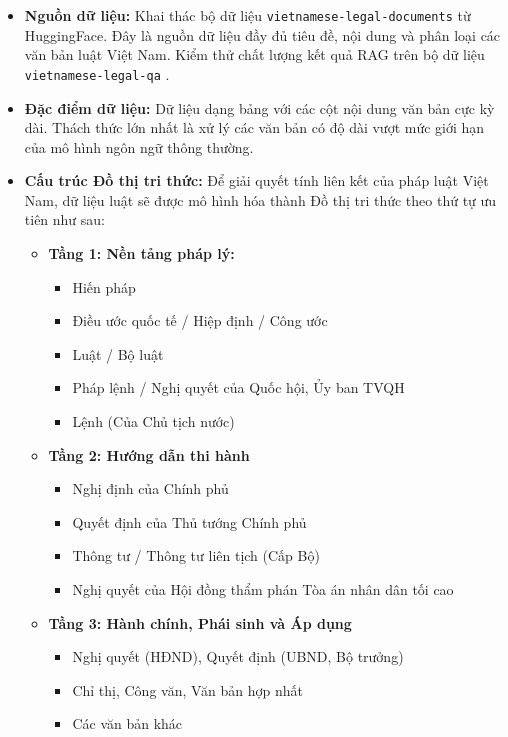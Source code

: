 \begin{itemize}
    \item \textbf{Nguồn dữ liệu:} Khai thác bộ dữ liệu \texttt{vietnamese-legal-documents} \cite{ngo_thinh_2026_vietnamese_legal} từ HuggingFace. Đây là nguồn dữ liệu đầy đủ tiêu đề, nội dung và phân loại các văn bản luật Việt Nam. Kiểm thử chất lượng kết quả RAG trên bộ dữ liệu \texttt{vietnamese-legal-qa} \cite{vietnamese_legal_qa}.
    \item \textbf{Đặc điểm dữ liệu:} Dữ liệu dạng bảng với các cột nội dung văn bản cực kỳ dài. Thách thức lớn nhất là xử lý các văn bản có độ dài vượt mức giới hạn của mô hình ngôn ngữ thông thường.
    \item \textbf{Cấu trúc Đồ thị tri thức:} Để giải quyết tính liên kết của pháp luật Việt Nam, dữ liệu luật sẽ được mô hình hóa thành Đồ thị tri thức theo thứ tự ưu tiên như sau:
    \begin{itemize}
        \item \textbf{Tầng 1: Nền tảng pháp lý:} 
        \begin{itemize}
            \item Hiến pháp
            \item Điều ước quốc tế / Hiệp định / Công ước
            \item Luật / Bộ luật
            \item Pháp lệnh / Nghị quyết của Quốc hội, Ủy ban TVQH
            \item Lệnh (Của Chủ tịch nước)
        \end{itemize} 

        \item \textbf{Tầng 2: Hướng dẫn thi hành}
        \begin{itemize}
            \item Nghị định của Chính phủ
            \item Quyết định của Thủ tướng Chính phủ
            \item Thông tư / Thông tư liên tịch (Cấp Bộ)
            \item Nghị quyết của Hội đồng thẩm phán Tòa án nhân dân tối cao
        \end{itemize}
        
        \item \textbf{Tầng 3: Hành chính, Phái sinh và Áp dụng} 
        \begin{itemize}
            \item Nghị quyết (HĐND), Quyết định (UBND, Bộ trưởng)
            \item Chỉ thị, Công văn, Văn bản hợp nhất
            \item Các văn bản khác
        \end{itemize}
        
    \end{itemize}
\end{itemize}


